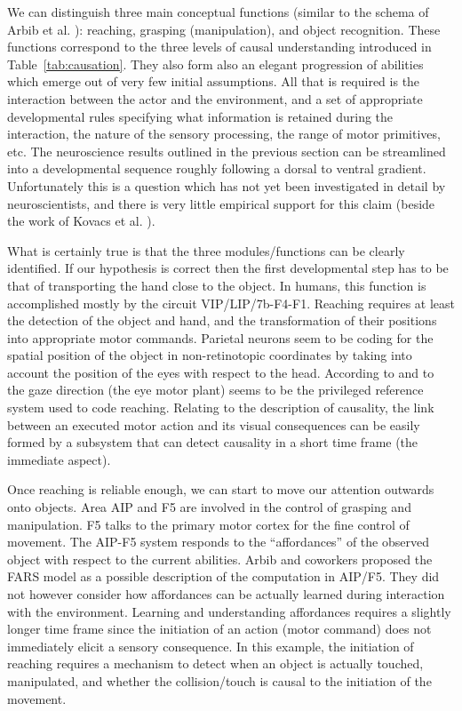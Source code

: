 We can distinguish three main conceptual functions (similar to the 
schema of Arbib et al. \cite{arbib-1981}): reaching, grasping (manipulation), and
object recognition. These functions correspond to the three levels of causal understanding introduced in Table~\ref{tab:causation}.
They also form also an elegant progression of abilities which emerge out
of very few initial assumptions. All that is required is the 
interaction between the actor and the environment, and a set of appropriate
developmental rules specifying what information is retained during the
interaction, the nature of the sensory processing, the range of motor
primitives, etc. 
%
The neuroscience results outlined in the previous section can be streamlined
into a developmental sequence roughly following a dorsal to ventral
gradient. Unfortunately this is a question which has not yet been investigated in detail
by neuroscientists, and there is very little empirical support for this claim
(beside the work of Kovacs et al. \cite{kovacs00human}).

What is certainly true is that the three modules/functions can be 
clearly identified. If our hypothesis is correct then 
the first developmental step has to be that of transporting the hand 
close to the object. In humans, this function is accomplished mostly by the
circuit VIP/LIP/7b-F4-F1. Reaching requires at least the detection of
the object and hand, and the transformation of their positions into appropriate 
motor commands. Parietal neurons seem to be coding for the spatial
position of the object in non-retinotopic coordinates by taking
into account the position of the eyes with respect to the head. 
According to \cite{pouget-ducom-torri-bavelier-2002} and 
to \cite{flanders-daghestani-berthoz-1999} the 
gaze direction (the eye motor plant) seems to be the privileged
reference system used to code reaching. 
Relating to the description of causality, the link between an executed
motor action and its visual consequences can be easily formed by 
a subsystem that can detect causality in a short time frame (the immediate
aspect).


Once reaching is reliable enough, we can start to move our attention 
outwards onto objects. Area AIP and F5 are involved in the
control of grasping and manipulation. F5 talks to the 
primary motor cortex for the fine control of movement. 
The AIP-F5 system responds to the ``affordances'' of the observed 
object with respect to the
current abilities.
Arbib and coworkers \cite{fagg-arbib-1998} proposed 
the FARS model as a possible description of the computation in AIP/F5. 
They did not however consider how affordances can be 
actually learned during interaction with the environment. 
Learning and understanding affordances requires a slightly longer 
time frame since the initiation of an action (motor command) does not
immediately elicit a sensory consequence. In this example, the initiation
of reaching requires a mechanism to detect when an object is actually 
touched, manipulated, and whether the collision/touch is causal to the
initiation of the movement.

